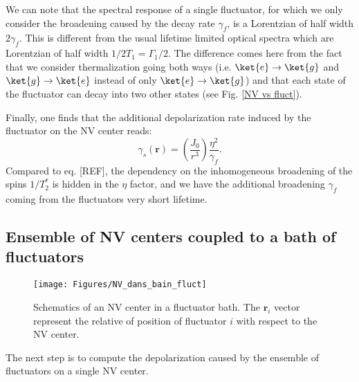 \documentclass[a4paper,11pt]{report}
\begin{document}
We can note that the spectral response of a single fluctuator, for which we only consider the broadening caused by the decay rate $\gamma_f$, is a Lorentzian of half width $2\gamma_f$. This is different from the usual lifetime limited optical spectra which are Lorentzian of half width $1/2T_1=\Gamma_1/2$. The difference comes here from the fact that we consider thermalization going both ways (i.e. $\ket{e} \to \ket{g}$ and $\ket{g} \to \ket{e}$ instead of only $\ket{e} \to \ket{g}$) and that each state of the fluctuator can decay into two other states (see Fig. \ref{NV vs fluct}).

Finally, one finds that the additional depolarization rate induced by the fluctuator on the NV center reads:
\begin{equation}
\gamma_s(\mathbf{r})=\left(\frac{J_0}{r^3}\right) \frac{\eta^2}{\gamma_f}.
\end{equation}
Compared to eq. [REF], the dependency on the inhomogeneous broadening of the spins $1/T_2^*$ is hidden in the $\eta$ factor, and we have the additional broadening $\gamma_f$ coming from the fluctuators very short lifetime.

\subsection{Ensemble of NV centers coupled to a bath of fluctuators}

\begin{figure}[h]
\centering
\texttt{[image: Figures/NV\_dans\_bain\_fluct]}
\caption{Schematics of an NV center in a fluctuator bath. The $\mathbf{r}_i$ vector represent the relative of position of fluctuator $i$ with respect to the NV center.}
\label{NV + bain fluct}
\end{figure}

The next step is to compute the depolarization caused by the ensemble of fluctuators on a single NV center.
\end{document}
